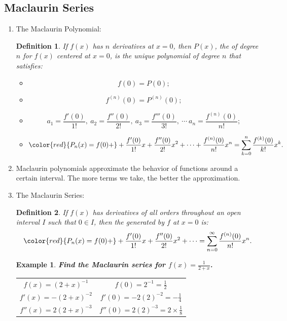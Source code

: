 \documentclass[12pt, a4paper]{article}
\newtheorem{definition}{Definition}[subsection]
\newtheorem{example}{Example}[subsection]
\begin{document}
\subsection{Maclaurin Series}
\begin{enumerate}
    \item The Maclaurin Polynomial: 
    \begin{definition}
        If $f(x)$ has $n$ derivatives at $x=0$, then $P(x)$, the \textbf{\color{red}{Maclaurin polynomial}} of degree $n$ for $f(x)$ centered at $x=0$, is the unique polynomial of degree $n$ that satisfies: 
        \begin{itemize}
            \item $$f(0)=P(0);$$
            \item $$f^{(n)}(0)=P^{(n)}(0);$$
            \item $$a_1=\frac{f'(0)}{1!},\ a_2=\frac{f''(0)}{2!},\ a_3=\frac{f'''(0)}{3!},\ \cdots\ a_n=\frac{f^{(n)}(0)}{n!};$$
            \item $${\color{red}{P_n(x)=f(0)+}+\frac{f'(0)}{1!}x+\frac{f''(0)}{2!}x^2+\cdots+\frac{f^{(n)}(0)}{n!}x^n=\sum_{k=0}^n\frac{f^{(k)}(0)}{k!}x^k}.$$
        \end{itemize}
    \end{definition}
    \item Maclaurin polynomials approximate the behavior of functions around a certain interval. The more terms we take, the better the approximation.
    \item The Maclaurin Series: 
    \begin{definition}
        If $f(x)$ has derivatives of all orders throughout an open interval $I$ such that $0\in I$, then the \textbf{\color{red}{Maclaurin series}} generated by $f$ at $x=0$ is: 
        $${\color{red}{P_n(x)=f(0)+}+\frac{f'(0)}{1!}x+\frac{f''(0)}{2!}x^2+\cdots=\sum_{n=0}^\infty\frac{f^{(n)}(0)}{n!}x^n}.$$
    \end{definition}
    {\color{green}{A series converges when the sum of them is a constant (a limit can be found).}}
    \begin{example}
        \textbf{Find the Maclaurin series for $f(x)=\frac{1}{2+x}$.}
        \begin{center}\begin{tabular}{c|c} 
            $f(x)=(2+x)^{-1}$&$f(0)=2^{-1}=\frac{1}{2}$\\
            $f'(x)=-(2+x)^{-2}$&$f'(0)=-2(2)^{-2}=-\frac{1}{4}$\\
            $f''(x)=2(2+x)^{-3}$&$f''(0)=2(2)^{-3}=2\times\frac{1}{8}$\\

\end{tabular}
\end{center}
\end{example}
\end{enumerate}
\end{document}
